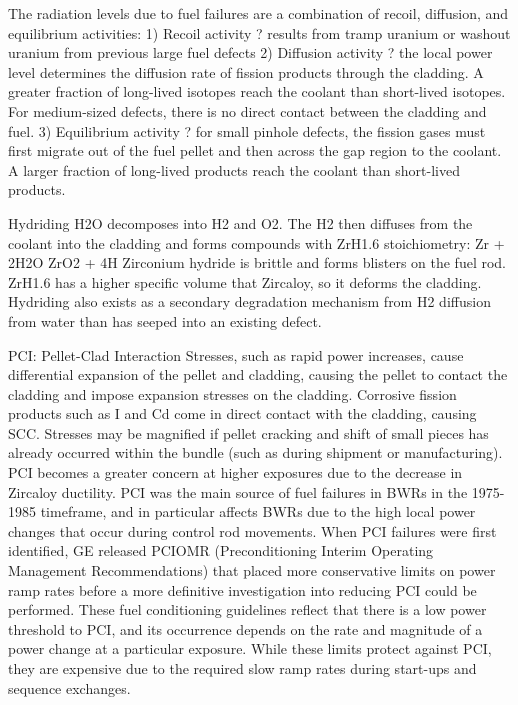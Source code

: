 \documentclass[10pt]{article}
\begin{document}
The radiation levels due to fuel failures are a combination of recoil, diffusion, and equilibrium activities:
1)	Recoil activity ? results from tramp uranium or washout uranium from previous large fuel defects
2)	Diffusion activity ? the local power level determines the diffusion rate of fission products through the cladding. A greater fraction of long-lived isotopes reach the coolant than short-lived isotopes. For medium-sized defects, there is no direct contact between the cladding and fuel.
3)	Equilibrium activity ? for small pinhole defects, the fission gases must first migrate out of the fuel pellet and then across the gap region to the coolant. A larger fraction of long-lived products reach the coolant than short-lived products. 

Hydriding
H2O decomposes into H2 and O2. The H2 then diffuses from the coolant into the cladding and forms compounds with ZrH1.6 stoichiometry:
Zr + 2H2O  ZrO2 + 4H
 Zirconium hydride is brittle and forms blisters on the fuel rod. ZrH1.6 has a higher specific volume that Zircaloy, so it deforms the cladding. Hydriding also exists as a secondary degradation mechanism from H2 diffusion from water than has seeped into an existing defect. 

PCI: Pellet-Clad Interaction
Stresses, such as rapid power increases, cause differential expansion of the pellet and cladding, causing the pellet to contact the cladding and impose expansion stresses on the cladding. Corrosive fission products such as I and Cd come in direct contact with the cladding, causing SCC. Stresses may be magnified if pellet cracking and shift of small pieces has already occurred within the bundle (such as during shipment or manufacturing). PCI becomes a greater concern at higher exposures due to the decrease in Zircaloy ductility. PCI was the main source of fuel failures in BWRs in the 1975-1985 timeframe, and in particular affects BWRs due to the high local power changes that occur during control rod movements. When PCI failures were first identified, GE released PCIOMR (Preconditioning Interim Operating Management Recommendations) that placed more conservative limits on power ramp rates before a more definitive investigation into reducing PCI could be performed. These fuel conditioning guidelines reflect that there is a low power threshold to PCI, and its occurrence depends on the rate and magnitude of a power change at a particular exposure. While these limits protect against PCI, they are expensive due to the required slow ramp rates during start-ups and sequence exchanges. 
\end{document}
